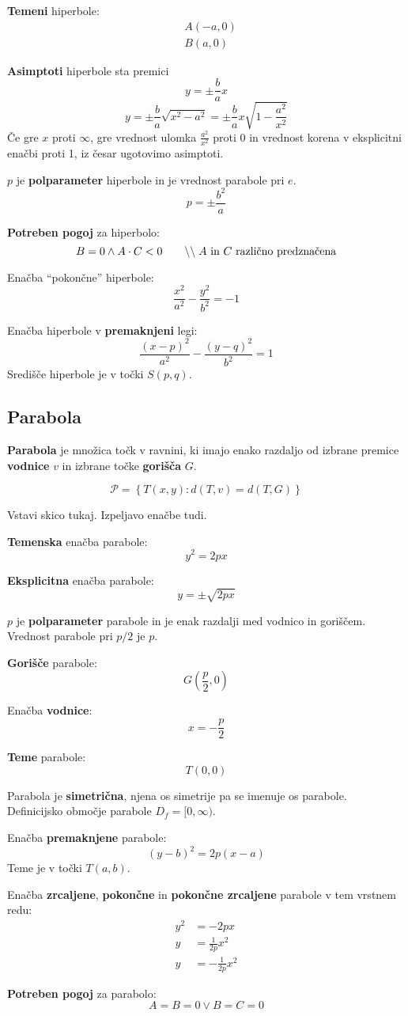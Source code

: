 \documentclass[a4paper,oneside,12pt,fleqn]{article}
\newcommand\krat\cdot
\newcommand{\comment}[1]{\ensuremath{\qquad\backslash\backslash\;}\textnormal{#1}}
\numberwithin{equation}{section}
\begin{document}
\textbf{Temeni} hiperbole:
\begin{align*}
  &A(-a, 0) \\
  &B(a, 0)
\end{align*}

\textbf{Asimptoti} hiperbole sta premici
\[ y = \pm \frac{b}{a}x \]
\[ y = \pm \frac{b}{a} \sqrt{x^2 - a^2}  = \pm \frac{b}{a} x \sqrt{1 -
\frac{a^2}{x^2}} \]
Če gre $x$ proti $\infty$, gre vrednost ulomka $\frac{a^2}{x^2}$ proti 0 in vrednost korena v eksplicitni enačbi proti 1, iz česar
ugotovimo asimptoti.

$p$ je \textbf{polparameter} hiperbole in je vrednost parabole pri $e$.
\[ p = \pm \frac{b^2}{a} \]

\textbf{Potreben pogoj} za hiperbolo:
\[ B = 0 \land A \krat C < 0 \comment{$A$ in $C$ različno predznačena} \]

Enačba ``pokončne'' hiperbole:
\[ \frac{x^2}{a^2} - \frac{y^2}{b^2} = -1 \]

Enačba hiperbole v \textbf{premaknjeni} legi:
\[ \frac{(x-p)^2}{a^2} - \frac{(y-q)^2}{b^2} = 1 \]
Središče hiperbole je v točki $S(p,q)$.


\subsection{Parabola}
\label{sec:stoz:parab}
\textbf{Parabola} je množica točk v ravnini, ki imajo enako razdaljo od izbrane premice
\textbf{vodnice} $v$ in izbrane točke \textbf{gorišča} $G$.

\[ \mathcal{P} = \left\{ T(x,y): d(T,v) = d(T,G) \right\} \]

Vstavi skico tukaj. Izpeljavo enačbe tudi.

\textbf{Temenska} enačba parabole:
\[ y^2 = 2px \]

\textbf{Eksplicitna} enačba parabole:
\[ y = \pm \sqrt{2px} \]

$p$ je \textbf{polparameter} parabole in je enak razdalji med vodnico in goriščem.
Vrednost parabole pri $p/2$ je $p$.

\textbf{Gorišče} parabole:
\[ G\left(\frac{p}{2}, 0  \right) \]

Enačba \textbf{vodnice}:
\[ x = -\frac{p}{2} \]

\textbf{Teme} parabole:
\[ T(0, 0) \]

Parabola je \textbf{simetrična}, njena os simetrije pa se imenuje os parabole. Definicijsko območje
parabole $D_f = [0, \infty)$.

Enačba \textbf{premaknjene} parabole:
\[ (y-b)^2 = 2p(x-a) \]
Teme je v točki $T(a, b)$.

Enačba \textbf{zrcaljene}, \textbf{pokončne} in \textbf{pokončne zrcaljene} parabole v tem vrstnem redu:
\begin{align*}
  y^2 &= -2px \\
  y &= \frac{1}{2p}x^2 \\
  y &= -\frac{1}{2p}x^2
\end{align*}

\textbf{Potreben pogoj} za parabolo:
\[ A = B = 0 \lor B = C = 0 \]

\printindex
\end{document}
